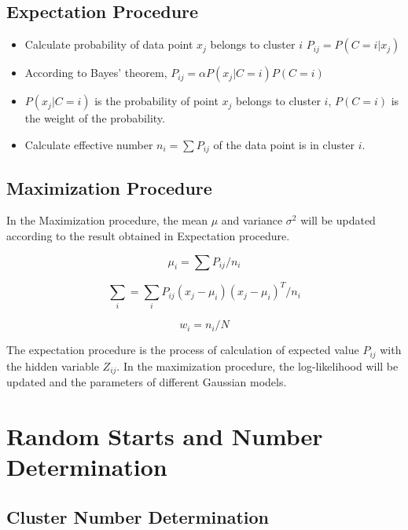 \documentclass[11pt, a4paper]{article}
\begin{document}
\subsection{Expectation Procedure}

\begin{itemize}
\item Calculate probability of data point $x_j$ belongs to cluster $i$ $P_{ij} = P(C=i|x_j)$
\item According to Bayes' theorem, $P_{ij} = \alpha P(x_j|C=i)P(C=i)$
\item $P(x_j|C=i)$ is the probability of point $x_j$ belongs to cluster $i$, $P(C=i)$ is the weight of the probability.
\item Calculate effective number $n_i = \sum P_{ij}$ of the data point is in cluster $i$.  
\end{itemize}

\subsection{Maximization Procedure}

In the Maximization procedure, the mean $\mu$ and variance ${\sigma}^2$ will be updated according to the result obtained in Expectation procedure.

\begin{equation}
	\mu_i = \sum P_{ij}/n_{i}
\end{equation}

\begin{equation}
	\sum_i = \sum_i P_{ij}(x_j - \mu_i){(x_j - \mu_i)}^{T}/n_i
\end{equation}

\begin{equation}
	w_i = n_i / N
\end{equation}

The expectation procedure is the process of calculation of expected value $P_{ij}$ with the hidden variable $Z_{ij}$. In the maximization procedure, the log-likelihood will be updated and the parameters of different Gaussian models.

\section{Random Starts and Number Determination}
\label{sec:2}
\subsection{Cluster Number Determination}
\end{document}
